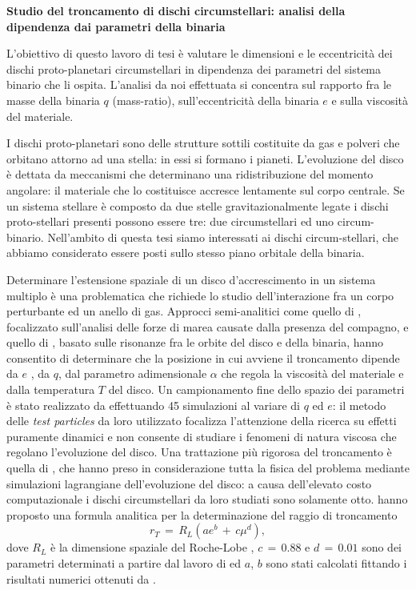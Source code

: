 \documentclass[12pt, a4paper]{report}
\begin{document}
\begin{center}
    {\large\textbf{Studio del troncamento di dischi circumstellari: analisi della dipendenza dai parametri della binaria}}
\end{center}

L'obiettivo di questo lavoro di tesi è valutare le dimensioni e le eccentricità dei dischi proto-planetari circumstellari in dipendenza dei parametri del sistema binario che li ospita.
L'analisi da noi effettuata si concentra sul rapporto fra le masse della binaria $q$ (mass-ratio), sull'eccentricità della binaria $e$ e sulla viscosità del materiale.

I dischi proto-planetari sono delle strutture sottili costituite da gas e polveri che orbitano attorno ad una stella: in essi si formano i pianeti.
L'evoluzione del disco è dettata da meccanismi che determinano una ridistribuzione del momento angolare: il materiale che lo costituisce accresce lentamente sul corpo centrale.
Se un sistema stellare è composto da due stelle gravitazionalmente legate i dischi proto-stellari presenti possono essere tre: due circumstellari ed uno circum-binario.
Nell'ambito di questa tesi siamo interessati ai dischi circum-stellari, che abbiamo considerato essere posti sullo stesso piano orbitale della binaria.

Determinare l'estensione spaziale di un disco d'accrescimento in un sistema multiplo è una problematica che richiede lo studio dell'interazione fra un corpo perturbante ed un anello di gas.
Approcci semi-analitici come quello di \textcite{PapaloizouPringle1977}, focalizzato sull'analisi delle forze di marea causate dalla presenza del compagno, e quello di \textcite{GoldreichTremaine1980}, basato sulle risonanze fra le orbite del disco e della binaria, hanno consentito di determinare che la posizione in cui avviene il troncamento dipende da $e$ , da $q$, dal parametro adimensionale $\alpha$ che regola la viscosità del materiale e dalla temperatura $T$ del disco. 
Un campionamento fine dello spazio dei parametri è stato realizzato da \textcite{Pichardo2005} effettuando 45 simulazioni al variare di $q$ ed $e$: il metodo delle \textit{test particles} da loro utilizzato focalizza l'attenzione della ricerca su effetti puramente dinamici e non consente di studiare i fenomeni di natura viscosa che regolano l'evoluzione del disco.
Una trattazione più rigorosa del troncamento è quella di \textcite{ArtymowiczLubow1994}, che hanno preso in considerazione tutta la fisica del problema mediante simulazioni lagrangiane dell'evoluzione del disco: a causa dell'elevato costo computazionale i dischi circumstellari da loro studiati sono solamente otto.
\textcite{ManaraTronc2019} hanno proposto una formula analitica per la determinazione del raggio di troncamento
\begin{equation}
r_T\,=\,R_{L} (a e^b\,+\,c\mu^d),
\label{eq:tronc_disc}
\end{equation}
dove $R_L$ è la dimensione spaziale del Roche-Lobe \parencite{Eggleton1983}, $c\,=\,0.88$ e $d\,=\,0.01$ sono dei parametri determinati a partire dal lavoro di \textcite{PapaloizouPringle1977} ed $a$, $b$ sono stati calcolati fittando i risultati numerici ottenuti da \textcite{ArtymowiczLubow1994}.
\end{document}
